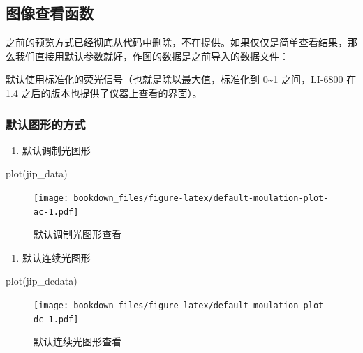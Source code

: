 \documentclass[
]{krantz}
\makeatletter
\newenvironment{Shaded}{\begin{snugshade}}{\end{snugshade}}
\newcommand{\FunctionTok}[1]{\textcolor[rgb]{0.00,0.00,0.00}{#1}}
\newcommand{\NormalTok}[1]{#1}
\providecommand{\tightlist}{%
  \setlength{\itemsep}{0pt}\setlength{\parskip}{0pt}}
\newenvironment{kframe}{%
\medskip{}
\setlength{\fboxsep}{.8em}
 \def\at@end@of@kframe{}%
 \ifinner\ifhmode%
  \def\at@end@of@kframe{\end{minipage}}%
  \begin{minipage}{\columnwidth}%
 \fi\fi%
 \def\FrameCommand##1{\hskip\@totalleftmargin \hskip-\fboxsep
 \colorbox{shadecolor}{##1}\hskip-\fboxsep
     \hskip-\linewidth \hskip-\@totalleftmargin \hskip\columnwidth}%
 \MakeFramed {\advance\hsize-\width
   \@totalleftmargin\z@ \linewidth\hsize
   \@setminipage}}%
 {\par\unskip\endMakeFramed%
 \at@end@of@kframe}
\renewenvironment{Shaded}{\begin{kframe}}{\end{kframe}}
\makeatother
\begin{document}
\hypertarget{plotfluor}{%
\subsection{图像查看函数}\label{plotfluor}}

之前的预览方式已经彻底从代码中删除，不在提供。如果仅仅是简单查看结果，那么我们直接用默认参数就好，作图的数据是之前导入的数据文件：

默认使用标准化的荧光信号（也就是除以最大值，标准化到 0\textasciitilde1 之间，LI-6800 在 1.4 之后的版本也提供了仪器上查看的界面）。

\hypertarget{default-plot-jiptest}{%
\subsubsection{默认图形的方式}\label{default-plot-jiptest}}

\begin{enumerate}
\def\labelenumi{\arabic{enumi}.}
\tightlist
\item
  默认调制光图形
\end{enumerate}

\begin{Shaded}
\begin{Highlighting}[]
\FunctionTok{plot}\NormalTok{(jip\_data)}
\end{Highlighting}
\end{Shaded}

\begin{figure}
\centering
\texttt{[image: bookdown\_files/figure-latex/default-moulation-plot-ac-1.pdf]}
\caption{\label{fig:default-moulation-plot-ac}默认调制光图形查看}
\end{figure}

\begin{enumerate}
\def\labelenumi{\arabic{enumi}.}
\setcounter{enumi}{1}
\tightlist
\item
  默认连续光图形
\end{enumerate}

\begin{Shaded}
\begin{Highlighting}[]
\FunctionTok{plot}\NormalTok{(jip\_dcdata)}
\end{Highlighting}
\end{Shaded}

\begin{figure}
\centering
\texttt{[image: bookdown\_files/figure-latex/default-moulation-plot-dc-1.pdf]}
\caption{\label{fig:default-moulation-plot-dc}默认连续光图形查看}
\end{figure}
\end{document}
